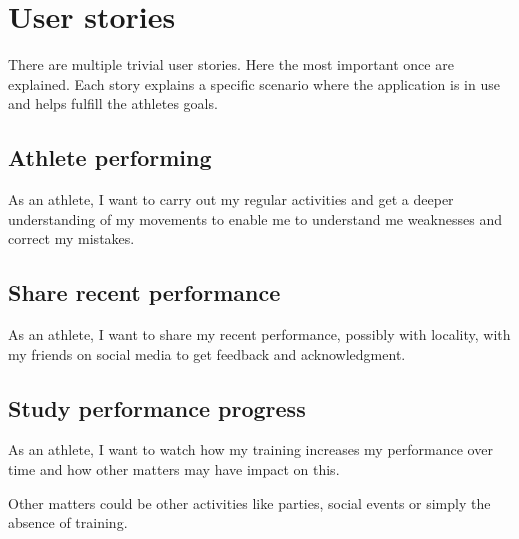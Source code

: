 \begingroup
\renewcommand{\cleardoublepage}{}
\renewcommand{\clearpage}{}
\chapter{User stories}
\endgroup

There are multiple trivial user stories. Here the most important once are explained. Each story explains a specific scenario where the application is in use and helps fulfill the athletes goals.

\section*{Athlete performing}
As an athlete, I want to carry out my regular activities and get a deeper understanding of my movements to enable me to understand me weaknesses and correct my mistakes.

\section*{Share recent performance}
As an athlete, I want to share my recent performance, possibly with locality, with my friends on social media to get feedback and acknowledgment.

\section*{Study performance progress}
As an athlete, I want to watch how my training increases my performance over time and how other matters may have impact on this.

Other matters could be other activities like parties, social events or simply the absence of training.

